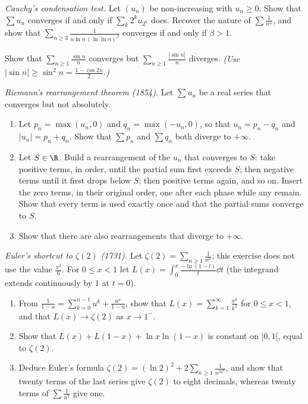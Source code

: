 \begin{exercise}[$\star\star$]\label{ex:condensation}
\emph{Cauchy's condensation test.} Let $(u_n)$ be non-increasing with $u_n\ge0$. Show that $\sum u_n$ converges if and only if $\sum_k2^ku_{2^k}$ does. Recover
the nature of $\sum\frac1{n^\alpha}$, and show that $\sum_{n\ge3}\frac1{n\ln n\,(\ln\ln n)^\beta}$ converges if and only if $\beta>1$.
\end{exercise}

\begin{exercise}[$\star\star$]\label{ex:sinn}
Show that $\sum_{n\ge1}\frac{\sin n}n$ converges but $\sum_{n\ge1}\frac{|\sin n|}n$ diverges. \emph{(Use $|\sin n|\ge\sin^2n=\frac{1-\cos2n}2$.)}
\end{exercise}

\begin{exercise}[$\star\star\star$]\label{ex:riemannrearr}
\emph{Riemann's rearrangement theorem (1854).} Let $\sum u_n$ be a real series that converges but not absolutely.
\begin{enumerate}[label=(\alph*)]
\item Let $p_n=\max(u_n,0)$ and $q_n=\max(-u_n,0)$, so that $u_n=p_n-q_n$ and $|u_n|=p_n+q_n$. Show that $\sum p_n$ and $\sum q_n$ both diverge to $+\infty$.
\item Let $S\in\R$. Build a rearrangement of the $u_n$ that converges to $S$: take positive terms, in order, until the partial sum first exceeds $S$; then negative terms until it first drops below $S$; then positive terms again, and so on. Insert the zero terms, in their original order, one after each phase while any remain. Show that every term is used exactly once and that the partial sums converge to $S$.
\item Show that there are also rearrangements that diverge to $+\infty$.
\end{enumerate}
\end{exercise}

\begin{exercise}[$\star\star\star$]\label{ex:eulerbasel}
\emph{Euler's shortcut to $\zeta(2)$ (1731).} Let $\zeta(2)=\sum_{n\ge1}\frac1{n^2}$; this exercise does not use the value $\frac{\pi^2}6$. For $0\le x<1$ let
$L(x)=\displaystyle\int_0^x\frac{-\ln(1-t)}t\dd t$ (the integrand extends continuously by $1$ at $t=0$).
\begin{enumerate}[label=(\alph*)]
\item From $\frac1{1-u}=\sum_{k=0}^{n-1}u^k+\frac{u^n}{1-u}$, show that $L(x)=\sum_{k=1}^\infty\frac{x^k}{k^2}$ for $0\le x<1$, and that $L(x)\to\zeta(2)$ as $x\to1^-$.
\item Show that $L(x)+L(1-x)+\ln x\ln(1-x)$ is constant on $]0,1[$, equal to $\zeta(2)$.
\item Deduce Euler's formula $\zeta(2)=(\ln2)^2+2\sum_{n\ge1}\frac1{n^22^n}$, and show that twenty terms of the last series give $\zeta(2)$ to eight decimals, whereas twenty terms of $\sum\frac1{n^2}$ give one.
\end{enumerate}
\end{exercise}

